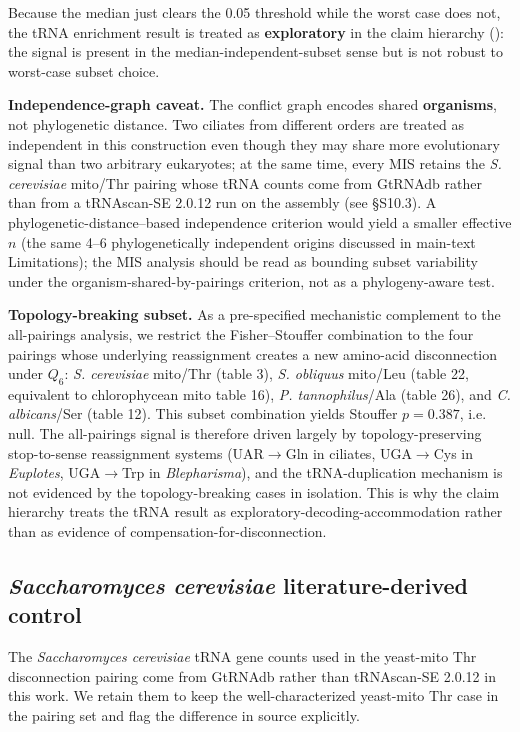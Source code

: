 \documentclass[preprint,11pt,authoryear,a4paper]{elsarticle}
\begin{document}
Because the median just clears the 0.05 threshold while the worst case
does not, the tRNA enrichment result is treated as \textbf{exploratory}
in the claim hierarchy (): the signal is present in
the median-independent-subset sense but is not robust to worst-case
subset choice.

\textbf{Independence-graph caveat.} The conflict graph encodes shared
\textbf{organisms}, not phylogenetic distance. Two ciliates from
different orders are treated as independent in this construction even
though they may share more evolutionary signal than two arbitrary
eukaryotes; at the same time, every MIS retains the \emph{S. cerevisiae}
mito/Thr pairing whose tRNA counts come from GtRNAdb rather than from a
tRNAscan-SE 2.0.12 run on the assembly (see §S10.3). A
phylogenetic-distance--based independence criterion would yield a
smaller effective \(n\) (the same 4--6 phylogenetically independent
origins discussed in main-text Limitations); the MIS analysis should be
read as bounding subset variability under the
organism-shared-by-pairings criterion, not as a phylogeny-aware test.

\textbf{Topology-breaking subset.} As a pre-specified mechanistic
complement to the all-pairings analysis, we restrict the
Fisher--Stouffer combination to the four pairings whose underlying
reassignment creates a new amino-acid disconnection under \(Q_{6}\):
\emph{S. cerevisiae} mito/Thr (table 3), \emph{S. obliquus} mito/Leu
(table 22, equivalent to chlorophycean mito table 16), \emph{P.
tannophilus}/Ala (table 26), and \emph{C. albicans}/Ser (table 12). This
subset combination yields Stouffer \(p = 0.387\), i.e. null. The
all-pairings signal is therefore driven largely by topology-preserving
stop-to-sense reassignment systems (UAR\(\rightarrow\)Gln in ciliates,
UGA\(\rightarrow\)Cys in \emph{Euplotes}, UGA\(\rightarrow\)Trp in
\emph{Blepharisma}), and the tRNA-duplication mechanism is not evidenced
by the topology-breaking cases in isolation. This is why the claim
hierarchy treats the tRNA result as exploratory-decoding-accommodation
rather than as evidence of compensation-for-disconnection.

\subsection{\texorpdfstring{\emph{Saccharomyces cerevisiae}
literature-derived
control}{Saccharomyces cerevisiae literature-derived control}}

The \emph{Saccharomyces cerevisiae} tRNA gene counts used in the
yeast-mito Thr disconnection pairing come from GtRNAdb \citep{chan2016}
rather than tRNAscan-SE 2.0.12 in this work. We retain them to keep the
well-characterized yeast-mito Thr case in the pairing set and flag the
difference in source explicitly.
\end{document}
